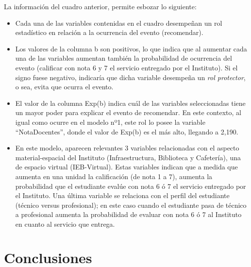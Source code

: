 \documentclass[]{book}
\begin{document}
La información del cuadro anterior, permite esbozar lo siguiente:

\begin{itemize}
\item
  Cada una de las variables contenidas en el cuadro desempeñan un rol
  estadístico en relación a la ocurrencia del evento (recomendar).
\item
  Los valores de la columna b son positivos, lo que indica que al
  aumentar cada una de las variables aumentan también la probabilidad de
  ocurrencia del evento (calificar con nota 6 y 7 el servicio entregado
  por el Instituto). Si el signo fuese negativo, indicaría que dicha
  variable desempeña un \emph{rol protector}, o sea, evita que ocurra el
  evento.
\item
  El valor de la columna Exp(b) indica cuál de las variables
  seleccionadas tiene un mayor poder para explicar el evento de
  recomendar. En este contexto, al igual como ocurre en el modelo nº1,
  este rol lo posee la variable ``NotaDocentes'', donde el valor de
  Exp(b) es el más alto, llegando a 2,190.
\item
  En este modelo, aparecen relevantes 3 variables relacionadas con el
  aspecto material-espacial del Instituto (Infraestructura, Biblioteca y
  Cafetería), una de espacio virtual (IEB-Virtual). Estas variables
  indican que a medida que aumenta en una unidad la calificación (de
  nota 1 a 7), aumenta la probabilidad que el estudiante evalúe con nota
  6 ó 7 el servicio entregado por el Instituto. Una última variable se
  relaciona con el perfil del estudiante (técnico versus profesional);
  en este caso cuando el estudiante pasa de técnico a profesional
  aumenta la probabilidad de evaluar con nota 6 ó 7 al Instituto en
  cuanto al servicio que entrega.
\end{itemize}

\chapter{Conclusiones}\label{conclusiones}
\end{document}
